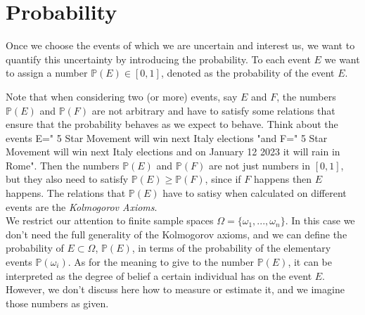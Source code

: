 \documentclass[12pt]{article}
\newcommand{\<}{{\langle \!\! \langle}}
\renewcommand{\>}{{\rangle \!\! \rangle}}
\begin{document}
%
%
%
%
%
%
%
%
%

\section{Probability}

Once we choose the events of which we are uncertain and interest us, we want to quantify this uncertainty by introducing the probability. To each event $E$ we want to assign a number $\mathbb{P}(E)\in[0,1]$, denoted as the probability of the event $E$. 
 
Note that when considering two (or more) events, say $E$ and $F$, the numbers $\mathbb{P}(E)$ and $\mathbb{P}(F)$ are not arbitrary and have to satisfy some relations that ensure that the probability behaves as we expect to behave. Think about the events E=" 5 Star Movement will win next Italy elections "and F=" 5 Star Movement will win next Italy elections and on January 12 2023 it will rain in Rome". Then the numbers $\mathbb{P}(E)$ and $\mathbb{P}(F)$ are not just numbers in  $[0,1]$, but they also need to satisfy $\mathbb{P}(E) \geq \mathbb{P}(F)$, since if $F$ happens then $E$ happens. The relations that $\mathbb{P}(E)$ have to satisy when calculated on different events are the \emph{Kolmogorov Axioms}.\\
 We restrict our attention to finite sample spaces $\Omega=\{\omega_1,...,\omega_n\}$. In this case we don't need the full generality of the Kolmogorov axioms,  and we can define the probability of $E \subset \Omega$, $\mathbb{P}(E)$, in  terms of the probability of the elementary events $\mathbb{P}(\omega_i)$.
 As for the meaning to give to the number $\mathbb{P}(E)$, it can be interpreted as the degree of belief a certain individual has on the event $E$. However, we don't discuss here how to measure or estimate it, and we imagine those numbers as given.
\end{document}

